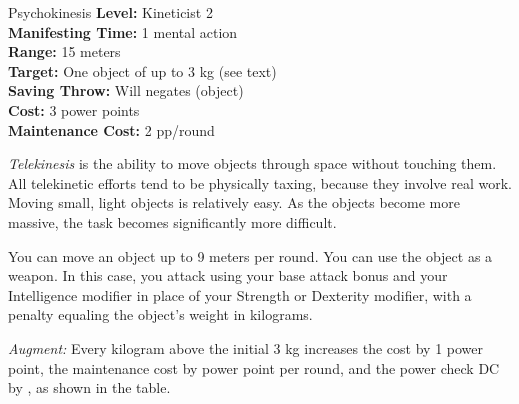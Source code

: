 {Psychokinesis}
{
	\textbf{Level:}
	Kineticist 2\\
	\textbf{Manifesting Time:}
	1 mental action\\
	\textbf{Range:}
	15 meters\\
	\textbf{Target:}
	One object of up to 3 kg (see text)\\
	\textbf{Saving Throw:}
	Will negates (object)\\
	\textbf{Cost:}
	3 power points\\
	\textbf{Maintenance Cost:}
	2 pp/round\\
}
{
	\emph{Telekinesis} is the ability to move objects through space without touching them.  All telekinetic efforts tend to be physically taxing, because they involve real work. Moving small, light objects is relatively easy. As the objects become more massive, the task becomes significantly more difficult.

	You can move an object up to 9 meters per round. You can use the object as a weapon. In this case, you attack using your base attack bonus and your Intelligence modifier in place of your Strength or Dexterity modifier, with a penalty equaling \onethird the object's weight in kilograms.

	\textit{Augment:} Every kilogram above the initial 3 kg increases the cost by 1 power point, the maintenance cost by \onehalf power point per round, and the power check DC by \onethird, as shown in the table. 

}
